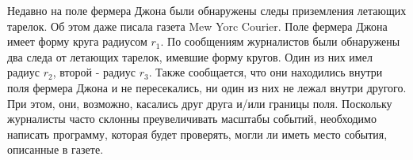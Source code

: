 Недавно на поле фермера Джона были обнаружены следы приземления летающих тарелок. Об этом даже писала газета Mew Yorc Courier.
Поле фермера Джона имеет форму круга радиусом $r_1$. По сообщениям журналистов были обнаружены два следа от летающих тарелок, имевшие форму кругов. Один из них имел радиус $r_2$, второй - радиус $r_3$. Также сообщается, что они находились внутри поля фермера Джона и не пересекались, ни один из них не лежал внутри другого. При этом, они, возможно, касались друг друга и/или границы поля.
Поскольку журналисты часто склонны преувеличивать масштабы событий, необходимо написать программу, которая будет проверять, могли ли иметь место события, описанные в газете.